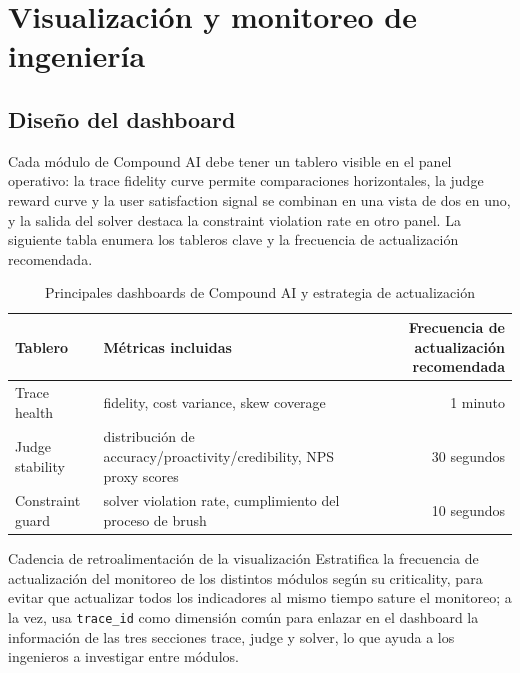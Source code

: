 \section{Visualización y monitoreo de ingeniería}

\subsection{Diseño del dashboard}
Cada módulo de Compound AI debe tener un tablero visible en el panel operativo: la trace fidelity curve permite comparaciones horizontales, la judge reward curve y la user satisfaction signal se combinan en una vista de dos en uno, y la salida del solver destaca la constraint violation rate en otro panel. La siguiente tabla enumera los tableros clave y la frecuencia de actualización recomendada.
\begin{table}[H]
\centering
\begin{tabular}{lp{8cm}r}
\toprule
Tablero & Métricas incluidas & Frecuencia de actualización recomendada \\
\midrule
Trace health & fidelity, cost variance, skew coverage & 1 minuto \\
Judge stability & distribución de accuracy/proactivity/credibility, NPS proxy scores & 30 segundos \\
Constraint guard & solver violation rate, cumplimiento del proceso de brush & 10 segundos \\
\bottomrule
\end{tabular}
\caption{Principales dashboards de Compound AI y estrategia de actualización}
\end{table}
\begin{knowledgebox}{Cadencia de retroalimentación de la visualización}
Estratifica la frecuencia de actualización del monitoreo de los distintos módulos según su criticality, para evitar que actualizar todos los indicadores al mismo tiempo sature el monitoreo; a la vez, usa \texttt{trace\_id} como dimensión común para enlazar en el dashboard la información de las tres secciones trace, judge y solver, lo que ayuda a los ingenieros a investigar entre módulos.
\end{knowledgebox}

